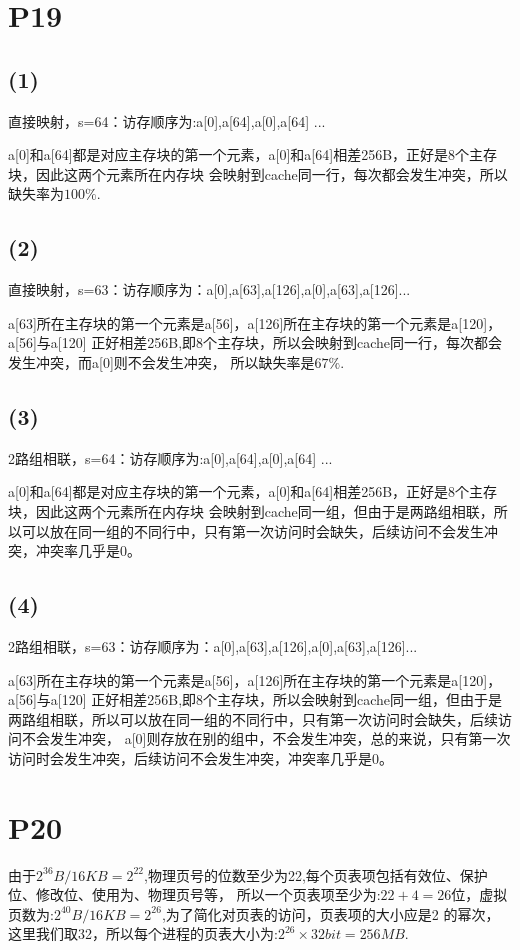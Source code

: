 \documentclass{article}
\begin{document}
\section{P19}
\subsection*{(1)}
直接映射，s=64：访存顺序为:a[0],a[64],a[0],a[64] ...

a[0]和a[64]都是对应主存块的第一个元素，a[0]和a[64]相差256B，正好是8个主存块，因此这两个元素所在内存块
会映射到cache同一行，每次都会发生冲突，所以缺失率为$100\%$.
\subsection*{(2)}
直接映射，s=63：访存顺序为：a[0],a[63],a[126],a[0],a[63],a[126]...

a[63]所在主存块的第一个元素是a[56]，a[126]所在主存块的第一个元素是a[120]，a[56]与a[120]
正好相差256B,即8个主存块，所以会映射到cache同一行，每次都会发生冲突，而a[0]则不会发生冲突，
所以缺失率是$67\%$.
\subsection*{(3)}
2路组相联，s=64：访存顺序为:a[0],a[64],a[0],a[64] ...

a[0]和a[64]都是对应主存块的第一个元素，a[0]和a[64]相差256B，正好是8个主存块，因此这两个元素所在内存块
会映射到cache同一组，但由于是两路组相联，所以可以放在同一组的不同行中，只有第一次访问时会缺失，后续访问不会发生冲突，冲突率几乎是$0$。
\subsection*{(4)}
2路组相联，s=63：访存顺序为：a[0],a[63],a[126],a[0],a[63],a[126]...

a[63]所在主存块的第一个元素是a[56]，a[126]所在主存块的第一个元素是a[120]，a[56]与a[120]
正好相差256B,即8个主存块，所以会映射到cache同一组，但由于是两路组相联，所以可以放在同一组的不同行中，只有第一次访问时会缺失，后续访问不会发生冲突，
a[0]则存放在别的组中，不会发生冲突，总的来说，只有第一次访问时会发生冲突，后续访问不会发生冲突，冲突率几乎是$0$。
\section{P20}
由于$2^{36}B/16KB=2^{22}$,物理页号的位数至少为22,每个页表项包括有效位、保护位、修改位、使用为、物理页号等，
所以一个页表项至少为:$22+4=26位$，虚拟页数为:$2^{40}B/16KB=2^{26}$,为了简化对页表的访问，页表项的大小应是2
的幂次，这里我们取32，所以每个进程的页表大小为:$2^{26}\times 32bit = 256MB$.
\end{document}
